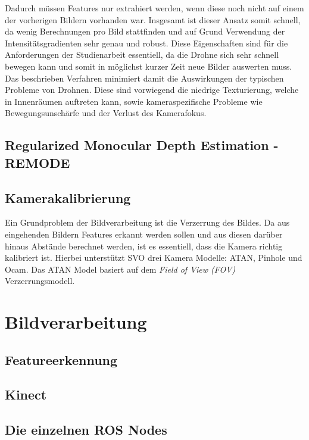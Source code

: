 Dadurch müssen Features nur extrahiert werden, wenn diese noch nicht auf einem der vorherigen Bildern vorhanden war. Insgesamt ist dieser Ansatz somit schnell, da wenig Berechnungen pro Bild stattfinden und auf Grund Verwendung der Intensitätsgradienten sehr genau und robust. \newline
Diese Eigenschaften sind für die Anforderungen der Studienarbeit essentiell, da die Drohne sich sehr schnell bewegen kann und somit in möglichst kurzer Zeit neue Bilder auswerten muss. Das beschrieben Verfahren minimiert damit die Auswirkungen der typischen Probleme von Drohnen. Diese sind vorwiegend die niedrige Texturierung, welche in Innenräumen auftreten kann, sowie kameraspezifische Probleme wie Bewegungsunschärfe und der Verlust des Kamerafokus.


\subsection{Regularized Monocular Depth Estimation - REMODE}



\subsection{Kamerakalibrierung}
Ein Grundproblem der Bildverarbeitung ist die Verzerrung des Bildes. Da aus eingehenden Bildern Features erkannt werden sollen und aus diesen darüber hinaus Abstände berechnet werden, ist es essentiell, dass die Kamera richtig kalibriert ist. \newline
Hierbei unterstützt SVO drei Kamera Modelle: ATAN, Pinhole und Ocam. \cite{svo_cameracalibration} \newline
Das ATAN Model basiert auf dem \textit{Field of View \emph{(FOV)}} Verzerrungsmodell. 



\section{Bildverarbeitung}
\label{Bildverarbeitung}

\subsection{Featureerkennung}
\subsection{Kinect}
\subsection{Die einzelnen ROS Nodes}
